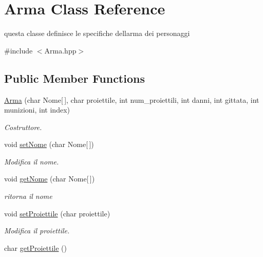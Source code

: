 \hypertarget{classArma}{}\section{Arma Class Reference}
\label{classArma}


questa classe definisce le specifiche dell\textquotesingle{}arma dei personaggi  




{\ttfamily \#include $<$Arma.\+hpp$>$}

\subsection*{Public Member Functions}
\begin{DoxyCompactItemize}
\item 
\hyperlink{classArma_ae76c11390a927581c503fc87af398050}{Arma} (char Nome\mbox{[}$\,$\mbox{]}, char proiettile, int num\+\_\+proiettili, int danni, int gittata, int munizioni, int index)
\begin{DoxyCompactList}\small\item\em Costruttore. \end{DoxyCompactList}\item 
void \hyperlink{classArma_a159430b592be94474863453b7fd148bb}{set\+Nome} (char Nome\mbox{[}$\,$\mbox{]})
\begin{DoxyCompactList}\small\item\em Modifica il nome. \end{DoxyCompactList}\item 
void \hyperlink{classArma_af0bfbb4ebf260eb1c694cafce1087d4e}{get\+Nome} (char Nome\mbox{[}$\,$\mbox{]})
\begin{DoxyCompactList}\small\item\em ritorna il nome \end{DoxyCompactList}\item 
\hypertarget{classArma_aba32016f48afb9c760bd50125331212e}{}void \hyperlink{classArma_aba32016f48afb9c760bd50125331212e}{set\+Proiettile} (char proiettile)\label{classArma_aba32016f48afb9c760bd50125331212e}

\begin{DoxyCompactList}\small\item\em Modifica il proiettile. \end{DoxyCompactList}\item 
\hypertarget{classArma_ac228c0055a41ef8fd1ba96720f92b678}{}char \hyperlink{classArma_ac228c0055a41ef8fd1ba96720f92b678}{get\+Proiettile} ()\label{classArma_ac228c0055a41ef8fd1ba96720f92b678}


\end{DoxyCompactItemize}
